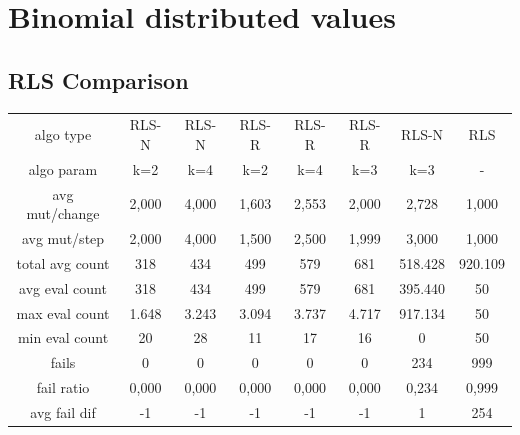
\section{Binomial distributed values}
\subsection{RLS Comparison}
\begin{tabular}[h]{cccccccc}
algo type&          RLS-N&   RLS-N&   RLS-R&   RLS-R&   RLS-R&   RLS-N&     RLS\\
algo param&           k=2&     k=4&     k=2&     k=4&     k=3&     k=3&       -\\
avg mut/change&     2,000&   4,000&   1,603&   2,553&   2,000&   2,728&   1,000\\
avg mut/step&       2,000&   4,000&   1,500&   2,500&   1,999&   3,000&   1,000\\
\hline
total avg count&      318&     434&     499&     579&     681& 518.428& 920.109\\
avg eval count&       318&     434&     499&     579&     681& 395.440&      50\\
max eval count&     1.648&   3.243&   3.094&   3.737&   4.717& 917.134&      50\\
min eval count&        20&      28&      11&      17&      16&       0&      50\\
\hline
fails&                  0&       0&       0&       0&       0&     234&     999\\
fail ratio&         0,000&   0,000&   0,000&   0,000&   0,000&   0,234&   0,999\\
avg fail dif&          -1&      -1&      -1&      -1&      -1&       1&     254\\
\end{tabular}
